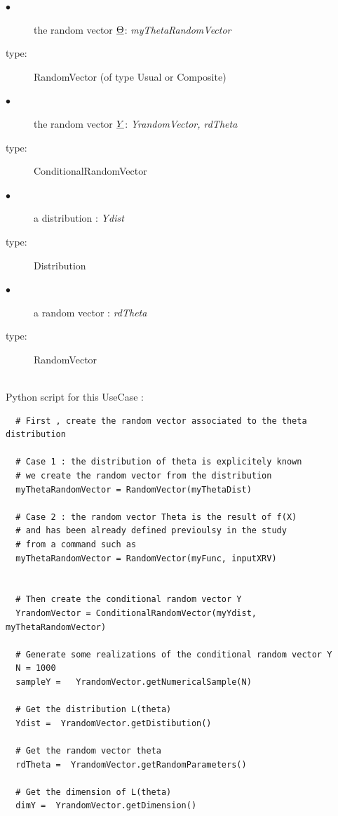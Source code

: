 {
  \begin{description}  \item[$\bullet$] the random vector ${\underline{\Theta}}$: {\itshape  myThetaRandomVector}
  \item[type:]  RandomVector (of type Usual or Composite)
  \item[$\bullet$] the random vector ${\underline{Y}}$: {\itshape YrandomVector, rdTheta}
  \item[type:]  ConditionalRandomVector
  \item[$\bullet$] a distribution   : {\itshape Ydist }
  \item[type:] Distribution
  \item[$\bullet$] a random vector   : {\itshape rdTheta }
  \item[type:] RandomVector
  \end{description}
}

\textspace\\
Python script for this UseCase :

\begin{lstlisting}
  # First , create the random vector associated to the theta distribution

  # Case 1 : the distribution of theta is explicitely known
  # we create the random vector from the distribution
  myThetaRandomVector = RandomVector(myThetaDist)

  # Case 2 : the random vector Theta is the result of f(X)
  # and has been already defined previoulsy in the study
  # from a command such as 
  myThetaRandomVector = RandomVector(myFunc, inputXRV)


  # Then create the conditional random vector Y
  YrandomVector = ConditionalRandomVector(myYdist, myThetaRandomVector)

  # Generate some realizations of the conditional random vector Y
  N = 1000
  sampleY =   YrandomVector.getNumericalSample(N)

  # Get the distribution L(theta)
  Ydist =  YrandomVector.getDistibution()

  # Get the random vector theta
  rdTheta =  YrandomVector.getRandomParameters()

  # Get the dimension of L(theta)
  dimY =  YrandomVector.getDimension()  
\end{lstlisting}
\textspace\\

